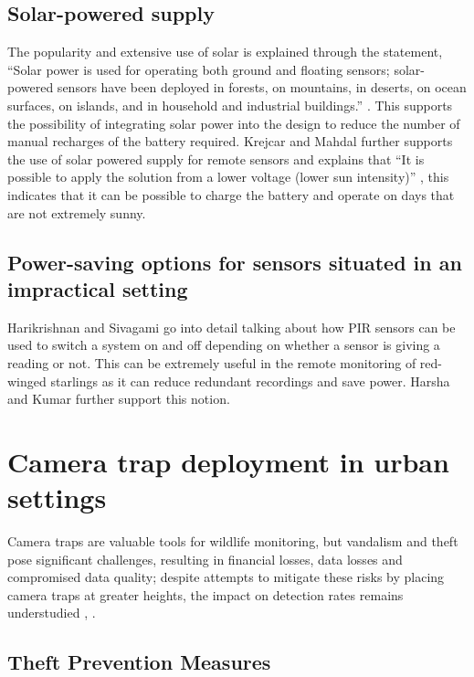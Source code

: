 \documentclass[class=report,11pt,crop=false]{standalone}
\begin{document}
\subsection{Solar-powered supply}

The popularity and extensive use of solar is explained through the statement, “Solar power is used for operating both ground and floating sensors; solar-powered sensors have been deployed in forests, on mountains, in deserts, on ocean surfaces, on islands, and in household and industrial buildings.” \cite{dewan2014alternative}. This supports the possibility of integrating solar power into the design to reduce the number of manual recharges of the battery required. Krejcar and Mahdal further supports the use of solar powered supply for remote sensors and explains that “It is possible to apply the solution from a lower voltage (lower sun intensity)” \cite{krejcar2012optimized}, this indicates that it can be possible to charge the battery and operate on days that are not extremely sunny.

\subsection{Power-saving options for sensors situated in an impractical setting}


Harikrishnan and Sivagami \cite{harikirshnan2017intelligent} go into detail talking about how PIR sensors can be used to switch a system on and off depending on whether a sensor is giving a reading or not. This can be extremely useful in the remote monitoring of red-winged starlings as it can reduce redundant recordings and save power. Harsha and Kumar \cite{harsha2020home} further support this notion.


\section{Camera trap deployment in urban settings} 

Camera traps are valuable tools for wildlife monitoring, but vandalism and theft pose significant challenges, resulting in financial losses, data losses and compromised data quality; despite attempts to mitigate these risks by placing camera traps at greater heights, the impact on detection rates remains understudied \cite{meek2016higher}, \cite{meek2019camera}.


\subsection{Theft Prevention Measures} 
\end{document}
